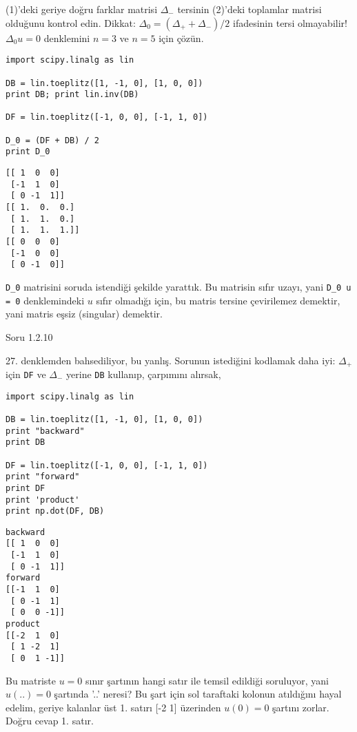 \documentclass[12pt,fleqn]{article}\usepackage{../../common}
\begin{document}
(1)'deki geriye doğru farklar matrisi $\Delta_{-}$ tersinin (2)'deki
toplamlar matrisi olduğunu kontrol edin. Dikkat: $\Delta_0 = (\Delta_{+} +
\Delta_{-}) / 2$ ifadesinin tersi olmayabilir! $\Delta_0 u = 0$ denklemini
$n=3$ ve $n=5$ için çözün.

\begin{verbatim}
import scipy.linalg as lin

DB = lin.toeplitz([1, -1, 0], [1, 0, 0])
print DB; print lin.inv(DB)

DF = lin.toeplitz([-1, 0, 0], [-1, 1, 0])

D_0 = (DF + DB) / 2
print D_0
\end{verbatim}

\begin{verbatim}
[[ 1  0  0]
 [-1  1  0]
 [ 0 -1  1]]
[[ 1.  0.  0.]
 [ 1.  1.  0.]
 [ 1.  1.  1.]]
[[ 0  0  0]
 [-1  0  0]
 [ 0 -1  0]]
\end{verbatim}

\verb!D_0! matrisini soruda istendiği şekilde yarattık. Bu matrisin sıfır
uzayı, yani \verb!D_0 u = 0! denklemindeki $u$ sıfır olmadığı için, bu
matris tersine çevirilemez demektir, yani matris eşsiz (singular)
demektir. 

Soru 1.2.10

27. denklemden bahsediliyor, bu yanlış. Sorunun istediğini kodlamak daha
iyi: $\Delta_+$ için \verb!DF! ve $\Delta_-$ yerine \verb!DB! kullanıp,
çarpımını alırsak,

\begin{verbatim}
import scipy.linalg as lin

DB = lin.toeplitz([1, -1, 0], [1, 0, 0])
print "backward"
print DB

DF = lin.toeplitz([-1, 0, 0], [-1, 1, 0])
print "forward"
print DF
print 'product'
print np.dot(DF, DB)
\end{verbatim}

\begin{verbatim}
backward
[[ 1  0  0]
 [-1  1  0]
 [ 0 -1  1]]
forward
[[-1  1  0]
 [ 0 -1  1]
 [ 0  0 -1]]
product
[[-2  1  0]
 [ 1 -2  1]
 [ 0  1 -1]]
\end{verbatim}

Bu matriste $u = 0$ sınır şartının hangi satır ile temsil edildiği
soruluyor, yani $u(..) = 0$ şartında '..' neresi? Bu şart için sol taraftaki
kolonun atıldığını hayal edelim, geriye kalanlar üst 1. satırı [-2 1]
üzerinden $u(0)=0$ şartını zorlar. Doğru cevap 1. satır.
\end{document}
